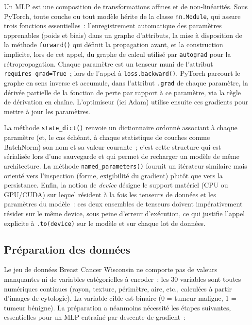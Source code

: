 \documentclass[11pt,a4paper]{article}
\begin{document}
Un MLP est une composition de transformations affines et de non-linéarités. Sous PyTorch, toute couche ou tout modèle hérite de la classe \texttt{nn.Module}, qui assure trois fonctions essentielles~: l'enregistrement automatique des paramètres apprenables (poids et biais) dans un graphe d'attributs, la mise à disposition de la méthode \texttt{forward()} qui définit la propagation avant, et la construction implicite, lors de cet appel, du graphe de calcul utilisé par \texttt{autograd} pour la rétropropagation. Chaque paramètre est un tenseur muni de l'attribut \texttt{requires\_grad=True}~; lors de l'appel à \texttt{loss.backward()}, PyTorch parcourt le graphe en sens inverse et accumule, dans l'attribut \texttt{.grad} de chaque paramètre, la dérivée partielle de la fonction de perte par rapport à ce paramètre, via la règle de dérivation en chaîne. L'optimiseur (ici Adam) utilise ensuite ces gradients pour mettre à jour les paramètres.

La méthode \texttt{state\_dict()} renvoie un dictionnaire ordonné associant à chaque paramètre (et, le cas échéant, à chaque statistique de couches comme BatchNorm) son nom et sa valeur courante~; c'est cette structure qui est sérialisée lors d'une sauvegarde et qui permet de recharger un modèle de même architecture. La méthode \texttt{named\_parameters()} fournit un itérateur similaire mais orienté vers l'inspection (forme, exigibilité du gradient) plutôt que vers la persistance. Enfin, la notion de \emph{device} désigne le support matériel (CPU ou GPU/CUDA) sur lequel résident à la fois les tenseurs de données et les paramètres du modèle~: ces deux ensembles de tenseurs doivent impérativement résider sur le même device, sous peine d'erreur d'exécution, ce qui justifie l'appel explicite à \texttt{.to(device)} sur le modèle et sur chaque lot de données.

\subsection{Préparation des données}

Le jeu de données Breast Cancer Wisconsin ne comporte pas de valeurs manquantes ni de variables catégorielles à encoder~: les 30 variables sont toutes numériques continues (rayon, texture, périmètre, aire, etc., calculées à partir d'images de cytologie). La variable cible est binaire (0 = tumeur maligne, 1 = tumeur bénigne). La préparation a néanmoins nécessité les étapes suivantes, essentielles pour un MLP entraîné par descente de gradient~:
\end{document}
